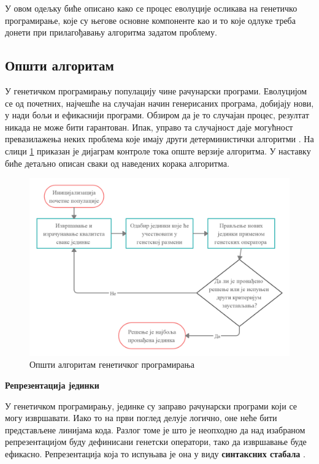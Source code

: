 \documentclass[a4paper]{article}
\begin{document}
У овом одељку биће описано како се процес еволуције осликава на генетичко програмирање, које су његове основне компоненте као и то које одлуке треба донети при прилагођавању алгоритма задатом проблему.

\subsection{Општи алгоритам}

У генетичком програмирању популацију чине рачунарски програми. Еволуцијом се од почетних, најчешће на случајан начин генерисаних програма, добијају нови, у нади бољи и ефикаснији програми. Обзиром да је то случајан процес, резултат никада не може бити гарантован. Ипак, управо та случајност даје могућност превазилажења неких проблема које имају други детерминистички алгоритми \cite{fieldGuidetoGP}. На слици \ref{fig:kontrola_toka} приказан је дијаграм контроле тока опште верзије алгоритма. У наставку биће детаљно описан сваки од наведених корака алгоритма.

\begin{figure}[h!]
    \begin{center}
        \includegraphics[scale=0.22]{opsti_algoritam.png}
    \end{center}
    \caption{Општи алгоритам генетичког програмирања}
    \label{fig:kontrola_toka}
\end{figure}

\bigskip
\noindent
\textbf{\large Репрезентација јединки}\newline

У генетичком програмирању, јединке су заправо рачунарски програми који се могу извршавати. Иако то на први поглед делује логично, оне неће бити представљене линијама кода. Разлог томе је што је неопходно да над изабраном репрезентацијом буду дефинисани генетски оператори, тако да извршавање буде ефикасно. Репрезентација која то испуњава је она у виду \textbf{синтаксних стабала} \cite{synTrees}.\newline
\end{document}
